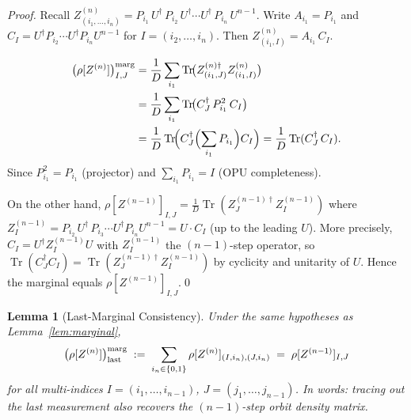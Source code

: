 \documentclass[12pt,a4paper]{article}
\newtheorem{lemma}[theorem]{Lemma}
\begin{document}
\begin{proof}
Recall
$Z^{(n)}_{(i_1,\ldots,i_n)} = P_{i_1}\,U^\dagger\,P_{i_2}\,U^\dagger\cdots
U^\dagger\,P_{i_n}\,U^{n-1}$.
Write $A_{i_1} = P_{i_1}$ and
$C_I = U^\dagger P_{i_2}\cdots U^\dagger P_{i_n} U^{n-1}$ for
$I=(i_2,\ldots,i_n)$.  Then $Z^{(n)}_{(i_1,I)} = A_{i_1}\,C_I$.

\begin{align}
  \bigl(\rho[Z^{(n)}]\bigr)^\mathrm{marg}_{I,J}
  &= \frac{1}{D}\sum_{i_1} \operatorname{Tr}\!\bigl(Z^{(n)\dag}_{(i_1,J)}
     Z^{(n)}_{(i_1,I)}\bigr) \notag\\
  &= \frac{1}{D}\sum_{i_1}
     \operatorname{Tr}\!\bigl(C_J^\dag\,P_{i_1}^2\,C_I\bigr) \notag\\
  &= \frac{1}{D}\operatorname{Tr}\!\Bigl(C_J^\dag
     \Bigl(\sum_{i_1}P_{i_1}\Bigr)C_I\Bigr)
   = \frac{1}{D}\operatorname{Tr}(C_J^\dag\,C_I).
\end{align}
Since $P_{i_1}^2=P_{i_1}$ (projector) and $\sum_{i_1}P_{i_1}=I$ (OPU completeness).

On the other hand, $\rho[Z^{(n-1)}]_{I,J} = \frac{1}{D}\operatorname{Tr}(Z^{(n-1)\dag}_J Z^{(n-1)}_I)$ where
$Z^{(n-1)}_I = P_{i_2}\,U^\dagger\,P_{i_3}\cdots U^\dagger P_{i_n} U^{n-1}
= U\cdot C_I$ (up to the leading $U$).  More precisely,
$C_I = U^\dagger Z^{(n-1)}_I U$ with $Z^{(n-1)}_I$ the $(n-1)$-step operator,
so $\operatorname{Tr}(C_J^\dag C_I) = \operatorname{Tr}(Z^{(n-1)\dag}_J Z^{(n-1)}_I)$
by cyclicity and unitarity of $U$.  Hence the marginal equals
$\rho[Z^{(n-1)}]_{I,J}$.\qed
\end{proof}

\begin{lemma}[Last-Marginal Consistency]\label{lem:marginal_last}
Under the same hypotheses as Lemma~\ref{lem:marginal},
\begin{equation}
  \bigl(\rho[Z^{(n)}]\bigr)^\mathrm{marg}_{\rm last}
  \;:=\;
  \sum_{i_n\in\{0,1\}} \rho[Z^{(n)}]_{(I,i_n),(J,i_n)}
  \;=\;
  \rho[Z^{(n-1)}]_{I,J}
\end{equation}
for all multi-indices $I=(i_1,\ldots,i_{n-1})$, $J=(j_1,\ldots,j_{n-1})$.
In words: tracing out the \emph{last} measurement also recovers the $(n-1)$-step orbit density matrix.
\end{lemma}
\end{document}

